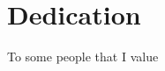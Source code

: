 \documentclass[../thesis.tex]{subfiles}
\begin{document}
\section*{Dedication}
To some people that I value

\pagebreak
\end{document}
